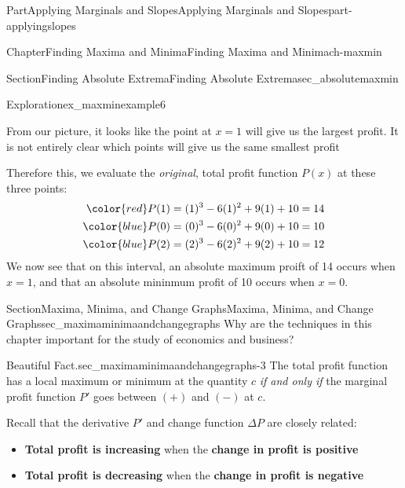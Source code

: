 \documentclass[oneside,10pt,]{tufte-book}
\newcommand{\terminology}[1]{\textbf{#1}}
\numberwithin{equation}{chapter}
\newcommand{\amp}{&}
\begin{document}
\begin{partptx}{Part}{Applying Marginals and Slopes}{}{Applying Marginals and Slopes}{}{}{part-applyingslopes}
\begin{chapterptx}{Chapter}{Finding Maxima and Minima}{}{Finding Maxima and Minima}{}{}{ch-maxmin}
\begin{sectionptx}{Section}{Finding Absolute Extrema}{}{Finding Absolute Extrema}{}{}{sec_absolutemaxmin}
\begin{exploration}{Exploration}{}{ex_maxminexample6}
\begin{enumerate}[font=\bfseries,label=(\alph*),ref=\alph*]
\begin{image}{0.25}{0.5}{0.25}{}
{
}%
\end{image}%
%
\par
From our picture, it looks like the point at \(x=1\) will give us the largest profit. It is not entirely clear which points will give us the same smallest profit%
\par
Therefore this, we evaluate the \emph{original}, total profit function \(P(x)\) at these three points:%
%
\begin{align*}
\color{red}  P(1) \amp = (1)^3 - 6(1)^2 + 9(1) + 10 = 14\\
\color{blue} P(0) \amp = (0)^3 - 6(0)^2 + 9(0) + 10 = 10\\
\color{blue} P(2) \amp = (2)^3 - 6(2)^2 + 9(2) + 10 = 12
\end{align*}
We now see that on this interval, an absolute maximum proift of \textdollar{}14 occurs when \(x=1\), and that an absolute mininmum profit of \textdollar{}10 occurs when \(x=0\).%
\end{enumerate}%
\end{exploration}%
\end{sectionptx}
%
%
\typeout{************************************************}
\typeout{************************************************}
%
\begin{sectionptx}{Section}{Maxima, Minima, and Change Graphs}{}{Maxima, Minima, and Change Graphs}{}{}{sec_maximaminimaandchangegraphs}
Why are the techniques in this chapter important for the study of economics and business?%
\begin{paragraphs}{Beautiful Fact.}{sec_maximaminimaandchangegraphs-3}%
The total profit function has a local maximum or minimum at the quantity \(c\) \emph{if and only if} the marginal profit function \(P'\) goes between \((+)\) and \((-)\) at \(c\).%
\par
Recall that the derivative \(P'\) and change function \(\Delta P\) are closely related:%
\begin{itemize}[label=\textbullet]
\item{}\terminology{Total profit is increasing} when the \terminology{change in profit is positive}%
\item{}\terminology{Total profit is decreasing} when the \terminology{change in profit is negative}%

\end{itemize}
\end{paragraphs}
\end{sectionptx}
\end{chapterptx}
\end{partptx}
\end{document}
